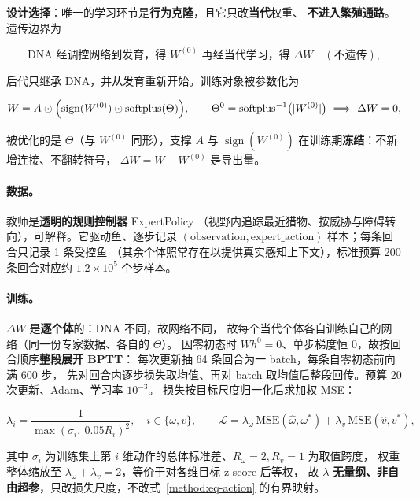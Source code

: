\textbf{设计选择}：唯一的学习环节是\textbf{行为克隆}，且它只改\textbf{当代}权重、
\textbf{不进入繁殖通路}。遗传边界为

\begin{equation}\label{method:eq-boundary}
\text{DNA 经调控网络到发育，得 } W^{(0)}
\text{ 再经当代学习，得 } \Delta W \quad(\text{不遗传}),
\end{equation}

后代只继承 DNA，并从发育重新开始。训练对象被参数化为

\begin{equation}\label{method:eq-wtheta}
W=A\odot\Bigl(\operatorname{sign}(W^{(0)})\odot\mathrm{softplus}(\Theta)\Bigr),
\qquad
\Theta^{0}=\mathrm{softplus}^{-1}\bigl(\lvert W^{(0)}\rvert\bigr)
\ \Longrightarrow\ \Delta W=0,
\end{equation}

被优化的是 $\Theta$（与 $W^{(0)}$ 同形），支撑 $A$ 与
$\operatorname{sign}(W^{(0)})$ 在训练期\textbf{冻结}：不新增连接、不翻转符号，
$\Delta W=W-W^{(0)}$ 是导出量。

\paragraph{数据。}教师是\textbf{透明的规则控制器} ExpertPolicy
（视野内追踪最近猎物、按威胁与障碍转向），可解释。它驱动鱼、逐步记录
$(\text{observation},\text{expert\_action})$ 样本；每条回合只记录 1 条受控鱼
（其余个体照常存在以提供真实感知上下文），标准预算 200 条回合对应约 $1.2\times10^{5}$ 个步样本。

\paragraph{训练。}$\Delta W$ 是\textbf{逐个体}的：DNA 不同，故网络不同，
故每个当代个体各自训练自己的网络（同一份专家数据、各自的 $\Theta$）。
因零初态时 $W h^{0}=0$、单步梯度恒 0，故按回合顺序\textbf{整段展开 BPTT}：
每次更新抽 64 条回合为一 batch，每条自零初态前向满 600 步，
先对回合内逐步损失取均值、再对 batch 取均值后整段回传。预算 20 次更新、Adam、学习率 $10^{-3}$。
损失按目标尺度归一化后求加权 MSE：

\begin{equation}\label{method:eq-bcloss}
\lambda_i=\frac{1}{\max(\sigma_i,\ 0.05R_i)^{2}},\quad i\in\{\omega,v\},
\qquad
\mathcal L=\lambda_\omega\,\mathrm{MSE}(\hat\omega,\omega^{*})
+\lambda_v\,\mathrm{MSE}(\hat v,v^{*}),
\end{equation}

其中 $\sigma_i$ 为训练集上第 $i$ 维动作的总体标准差、$R_\omega=2,R_v=1$ 为取值跨度，
权重整体缩放至 $\lambda_\omega+\lambda_v=2$，等价于对各维目标 z-score 后等权，
故 $\lambda$ \textbf{无量纲、非自由超参}，只改损失尺度，不改式~\eqref{method:eq-action} 的有界映射。


